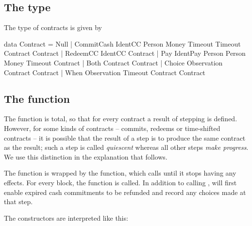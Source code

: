 \documentclass[runningheads]{llncs}
\begin{document}
\subsection{The  type}

The type of contracts is given by

\begin{haskellcode}
data Contract =
   Null |
   CommitCash IdentCC Person Money Timeout Timeout Contract Contract |  
   RedeemCC IdentCC Contract |
   Pay IdentPay Person Person Money Timeout Contract |  
   Both Contract Contract |
   Choice Observation Contract Contract |
   When Observation Timeout Contract Contract   
   \end{haskellcode}

\subsection{The  function}


The  function is total, so that for every contract a result of stepping is defined. However, for 
some kinds of contracts -- commits, redeems or time-shifted contracts -- it is possible that the result of a step is to 
produce the same contract as the result; such a step is called \emph{quiescent} whereas all other steps \emph{make 
progress}. We use this distinction in the explanation that follows.


The function  is wrapped by the  function, which calls  
until it stops having any effects. For every block, the  function is called. In addition to 
calling ,  will first enable expired cash commitments to be refunded and 
record any choices made at that step.

The constructors are interpreted like this:
\end{document}
